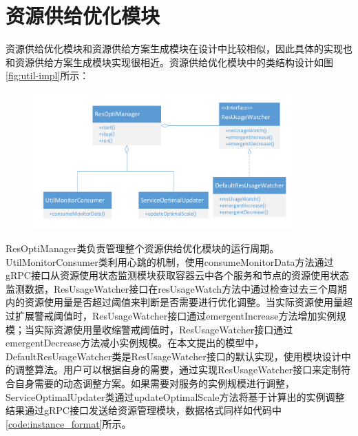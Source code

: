 \section{资源供给优化模块}
资源供给优化模块和资源供给方案生成模块在设计中比较相似，因此具体的实现也和资源供给方案生成模块实现很相近。资源供给优化模块中的类结构设计如图\ref{fig:util-impl}所示：
\begin{figure}[H]
\centering
\includegraphics[width=0.9\textwidth]{./figure/optimize_impl}
\end{figure}
ResOptiManager类负责管理整个资源供给优化模块的运行周期。UtilMonitorConsumer类利用心跳的机制，使用consumeMonitorData方法通过gRPC接口从资源使用状态监测模块获取容器云中各个服务和节点的资源使用状态监测数据，ResUsageWatcher接口在resUsageWatch方法中通过检查过去三个周期内的资源使用量是否超过阈值来判断是否需要进行优化调整。当实际资源使用量超过扩展警戒阈值时，ResUsageWatcher接口通过emergentIncrease方法增加实例规模；当实际资源使用量收缩警戒阈值时，ResUsageWatcher接口通过emergentDecrease方法减小实例规模。在本文提出的模型中，DefaultResUsageWatcher类是ResUsageWatcher接口的默认实现，使用模块设计中的调整算法。用户可以根据自身的需要，通过实现ResUsageWatcher接口来定制符合自身需要的动态调整方案。如果需要对服务的实例规模进行调整，ServiceOptimalUpdater类通过updateOptimalScale方法将基于计算出的实例调整结果通过gRPC接口发送给资源管理模块，数据格式同样如代码中\ref{code:instance_format}所示。

